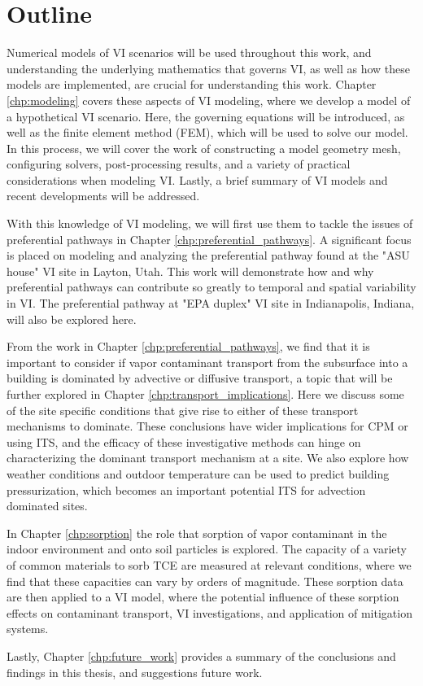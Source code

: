 \section{Outline}

Numerical models of VI scenarios will be used throughout this work, and understanding the underlying mathematics that governs VI, as well as how these models are implemented, are crucial for understanding this work.
Chapter \ref{chp:modeling} covers these aspects of VI modeling, where we develop a model of a hypothetical VI scenario.
Here, the governing equations will be introduced, as well as the finite element method (FEM), which will be used to solve our model.
In this process, we will cover the work of constructing a model geometry mesh, configuring solvers, post-processing results, and a variety of practical considerations when modeling VI.
Lastly, a brief summary of VI models and recent developments will be addressed.\par

With this knowledge of VI modeling, we will first use them to tackle the issues of preferential pathways in Chapter \ref{chp:preferential_pathways}.
A significant focus is  placed on modeling and analyzing the preferential pathway found at the "ASU house" VI site in Layton, Utah.
This work will demonstrate how and why preferential pathways can contribute so greatly to temporal and spatial variability in VI.
The preferential pathway at "EPA duplex" VI site in Indianapolis, Indiana, will also be explored here.\par

From the work in Chapter \ref{chp:preferential_pathways}, we find that it is important to consider if vapor contaminant transport from the subsurface into a building is dominated by advective or diffusive transport, a topic that will be further explored in Chapter \ref{chp:transport_implications}.
Here we discuss some of the site specific conditions that give rise to either of these transport mechanisms to dominate.
These conclusions have wider implications for CPM or using ITS, and the efficacy of these investigative methods can hinge on characterizing the dominant transport mechanism at a site.
We also explore how weather conditions and outdoor temperature can be used to predict building pressurization, which becomes an important potential ITS for advection dominated sites.\par

In Chapter \ref{chp:sorption} the role that sorption of vapor contaminant in the indoor environment and onto soil particles is explored.
The capacity of a variety of common materials to sorb TCE are measured at relevant conditions, where we find that these capacities can vary by orders of magnitude.
These sorption data are then applied to a VI model, where the potential influence of these sorption effects on contaminant transport, VI investigations, and application of mitigation systems.\par

Lastly, Chapter \ref{chp:future_work} provides a summary of the conclusions and findings in this thesis, and suggestions future work.\par
